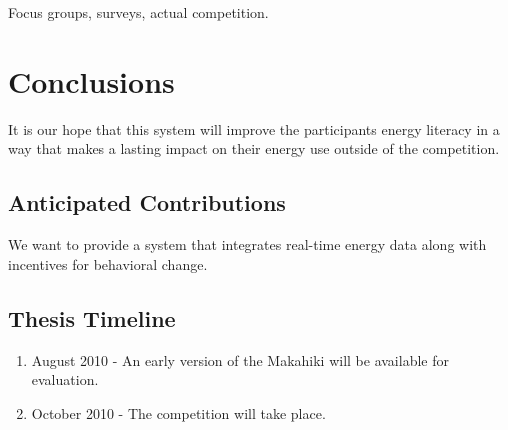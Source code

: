 Focus groups, surveys, actual competition.

\chapter{Conclusions}

It is our hope that this system will improve the participants energy literacy in a way that makes a lasting impact on their energy use outside of the competition.

\section{Anticipated Contributions}

We want to provide a system that integrates real-time energy data along with incentives for behavioral change.

\section{Thesis Timeline}

\begin{enumerate}
\item August 2010 - An early version of the Makahiki will be available for evaluation.
\item October 2010 - The competition will take place.
\end{enumerate}